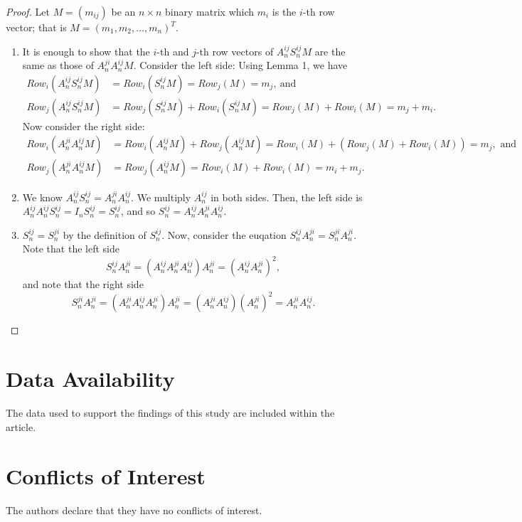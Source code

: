 \myprop*
\begin{proof}
	Let $ M=(m_{ij} ) $ be an $ n\times n $ binary matrix which $ m_i $ is the $ i $-th row vector; that is $ M=(m_1,m_2,…,m_n )^T $.
	\begin{enumerate}
		\item It is enough to show that the $ i $-th and $ j $-th row vectors of $ A_n^{ij} S_n^{ij} M $ are the same as those of $ A_n^{ji} A_n^{ij}  M $. Consider the left side: Using Lemma 1, we have 
		\begin{align*}
		Row_i (A_n^{ij} S_n^{ij} M)&=Row_i (S_n^{ij} M)=Row_j (M)=m_j,\ \text{and}\\
		Row_j (A_n^{ij} S_n^{ij} M)&=Row_j (S_n^{ij} M)+Row_i (S_n^{ij} M)=Row_j (M)+Row_i (M)=m_j+m_i .
		\end{align*}
		Now consider the right side:
		\begin{align*}
		Row_i (A_n^{ji} A_n^{ij} M)&=Row_i (A_n^{ij} M)+Row_j (A_n^{ij} M)=Row_i (M)+(Row_j (M)+Row_i (M))=m_j, \text{ and} \\
		Row_j (A_n^{ji} A_n^{ij} M)&=Row_j (A_n^{ij} M)=Row_i (M)+Row_i (M) = m_i+m_j .
		\end{align*}
		\item 	We know $ A_n^{ij} S_n^{ij} = A_n^{ji} A_n^{ij} $. We multiply $ A_n^{ij} $ in both sides. Then, the left side is $ A_n^{ij} A_n^{ij} S_n^{ij}=I_n S_n^{ij}=S_n^{ij} $, and so $ S_n^{ij}=A_n^{ij} A_n^{ji} A_n^{ij} $.
		\item $ S_n^{ij} = S_n^{ji} $ by the definition of $ S_n^{ij} $. Now, consider the euqation $ S_n^{ij}A_n^{ji} = S_n^{ji}A_n^{ji} $. Note that the left side
		\[S_n^{ij}A_n^{ji} = \left( A_n^{ij}A_n^{ji}A_n^{ij}\right)A_n^{ji} = \left(A_n^{ij}A_n^{ji}\right)^2,\]
		and note that the right side
		\[ S_n^{ji}A_n^{ji} = \left(A_n^{ji}A_n^{ij}A_n^{ji}\right)A_n^{ji} = \left(A_n^{ji}A_n^{ij}\right)\left(A_n^{ji}\right)^2 = A_n^{ji}A_n^{ij} . \] 
	\end{enumerate} 
\end{proof}

\section*{Data Availability}
The data used to support the findings of this study are included within the article.

\section*{Conflicts of Interest}
The authors declare that they have no conflicts of interest.

